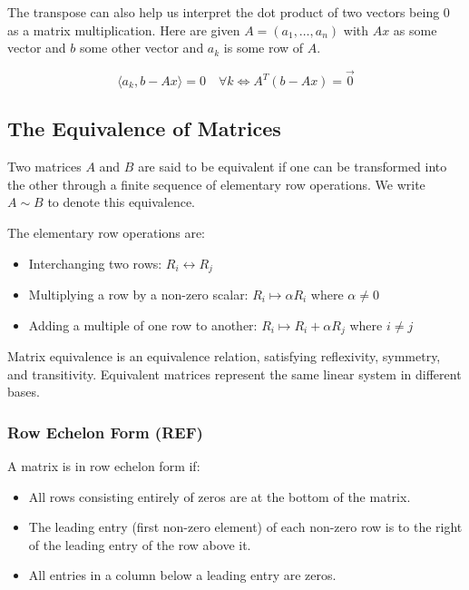 The transpose can also help us interpret the dot product of two vectors being 0 as a matrix multiplication.
Here are given \(A = (a_1, \dots, a_n)\) with \(Ax\) as some vector and \(b\) some other vector and 
\(a_k\) is some row of \(A\).

\[
    \langle a_k, b - Ax \rangle = 0 \quad \forall k \iff A^{T} (b - Ax) = \vec{0}
\]

\subsection{The Equivalence of Matrices}

Two matrices \(A\) and \(B\) are said to be equivalent if one can be transformed into the other through a finite sequence of elementary row operations. We write \(A \sim B\) to denote this equivalence.

The elementary row operations are:

\begin{itemize}
    \item Interchanging two rows: \(R_i \leftrightarrow R_j\)
    \item Multiplying a row by a non-zero scalar: \(R_i \mapsto \alpha R_i\) where \(\alpha \neq 0\)
    \item Adding a multiple of one row to another: \(R_i \mapsto R_i + \alpha R_j\) where \(i \neq j\)
\end{itemize}

Matrix equivalence is an equivalence relation, satisfying reflexivity, symmetry, and transitivity. Equivalent matrices represent the same linear system in different bases.

\subsubsection{Row Echelon Form (REF)}

A matrix is in row echelon form if:

\begin{itemize}
    
    \item All rows consisting entirely of zeros are at the bottom of the matrix.
    
    \item The leading entry (first non-zero element) of each non-zero row is to the right of the leading entry of the row above it.
    
    \item All entries in a column below a leading entry are zeros.

\end{itemize}

